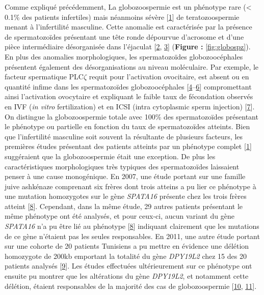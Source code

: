 \documentclass[12pt,twoside]{reedthesis}
\begin{document}
  Comme expliqué précédemment, La globozoospermie est un phénotype rare
  (\textless{} 0.1\% des patients infertiles) mais néanmoins sévère
  {[}\protect\hyperlink{ref-Sen2009}{1}{]} de teratozoospermie menant à
  l'infertilité masculine. Cette anomalie est caractérisée par la présence
  de spermatozoïdes présentant une tête ronde dépourvue d'acrosome et
  d'une pièce intermédiaire désorganisée dans l'éjaculat
  {[}\protect\hyperlink{ref-Singh}{2},
  \protect\hyperlink{ref-Pedersen1974}{3}{]} (\textbf{Figure :
  }\ref{fig:globospz}). En plus des anomalies morphologiques, les
  spermatozoïdes globozoocéphales présentent également des
  désorganisations au niveau moléculaire. Par exemple, le facteur
  spermatique PLC\(\zeta\) requit pour l'activation ovocitaire, est absent
  ou en quantité infime dans les spermatozoïdes globozoocéphales
  {[}\protect\hyperlink{ref-Heytens2009}{4}--\protect\hyperlink{ref-Yoon2008}{6}{]}
  compromettant ainsi l'activation ovocytaire et expliquant le faible taux
  de fécondation observés en IVF (\emph{in vitro} fertilization) et en
  ICSI (intra cytoplasmic sperm injection)
  {[}\protect\hyperlink{ref-Dam2006}{7}{]}. On distingue la
  globozoospermie totale avec 100\% des spermatozoïdes présentant le
  phénotype ou partielle en fonction du taux de spermatozoïdes atteints.
  Bien que l'infertilité masculine soit souvent la résultante de plusieurs
  facteurs, les premières études présentant des patients atteints par un
  phénotype complet {[}\protect\hyperlink{ref-Sen2009}{1}{]} suggéraient
  que la globozoospermie était une exception. De plus les caractéristiques
  morphologiques très typiques des spermatozoïdes laissaient penser à une
  cause monogénique. En 2007, une étude portant sur une famille juive
  ashkénaze comprenant six frères dont trois atteins a pu lier ce
  phénotype à une mutation homozygotes sur le gène \emph{SPATA16} présente
  chez les trois frères atteint {[}\protect\hyperlink{ref-Dam2007}{8}{]}.
  Cependant, dans la même étude, 29 autres patients présentant le même
  phénotype ont été analysés, et pour ceux-ci, aucun variant du gène
  \emph{SPATA16} n'a pu être lié au phénotype
  {[}\protect\hyperlink{ref-Dam2007}{8}{]} indiquant clairement que les
  mutations de ce gène n'étaient pas les seules responsables. En 2011, une
  autre étude portant sur une cohorte de 20 patients Tunisiens a pu mettre
  en évidence une délétion homozygote de 200kb emportant la totalité du
  gène \emph{DPY19L2} chez 15 des 20 patients analysés
  {[}\protect\hyperlink{ref-Harbuz2011}{9}{]}. Les études effectuées
  ultérieurement sur ce phénotype ont ensuite pu montrer que les
  altérations du gène \emph{DPY19L2}, et notamment cette délétion, étaient
  responsables de la majorité des cas de globozoospermie
  {[}\protect\hyperlink{ref-Ray2011}{10},
  \protect\hyperlink{ref-ElInati2012}{11}{]}.
  
\end{document}
